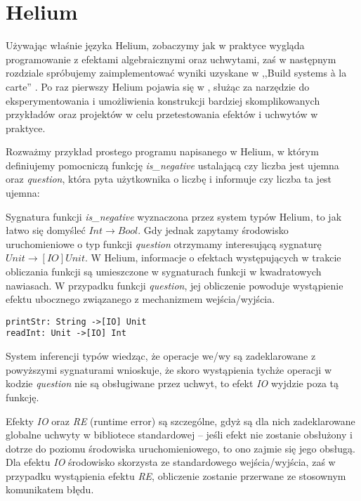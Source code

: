 \section{Helium}

\lstset{language=Haleff, showstringspaces=false}

Używając właśnie języka Helium, zobaczymy jak w praktyce wygląda programowanie z efektami algebraicznymi oraz uchwytami, zaś w następnym rozdziale spróbujemy zaimplementować wyniki uzyskane w ,,Build systems {\`a} la carte'' \cite{mokhov2018build, mokhov2020build}. Po raz pierwszy Helium pojawia się w \cite{biernacki2019abstracting}, służąc za narzędzie do eksperymentowania i umożliwienia konstrukcji bardziej skomplikowanych przykładów oraz projektów w celu przetestowania efektów i uchwytów w praktyce.

Rozważmy przykład prostego programu napisanego w Helium, w którym definiujemy pomocniczą funkcję \textit{is\_negative} ustalającą czy liczba jest ujemna oraz \textit{question}, która pyta użytkownika o liczbę i informuje czy liczba ta jest ujemna:



Sygnatura funkcji \textit{is\_negative} wyznaczona przez system typów Helium, to jak łatwo się domyśleć \(\mathit{Int \rightarrow Bool}\). Gdy jednak zapytamy środowisko uruchomieniowe o typ funkcji \textit{question} otrzymamy interesującą sygnaturę \(\mathit{Unit \rightarrow[IO] Unit}\). W Helium, informacje o efektach występujących w trakcie obliczania funkcji są umieszczone w sygnaturach funkcji w kwadratowych nawiasach. W przypadku funkcji \textit{question}, jej obliczenie powoduje wystąpienie efektu ubocznego związanego z mechanizmem wejścia/wyjścia. 

\begin{lstlisting}
printStr: String ->[IO] Unit
readInt: Unit ->[IO] Int
\end{lstlisting}

System inferencji typów wiedząc, że operacje we/wy są zadeklarowane z powyższymi sygnaturami wnioskuje, że skoro wystąpienia tychże operacji w kodzie \textit{question} nie są obsługiwane przez uchwyt, to efekt \textit{IO} wyjdzie poza tą funkcję.

Efekty \textit{IO} oraz \textit{RE} (runtime error) są szczególne, gdyż są dla nich zadeklarowane globalne uchwyty w bibliotece standardowej -- jeśli efekt nie zostanie obsłużony i dotrze do poziomu środowiska uruchomieniowego, to ono zajmie się jego obsługą. Dla efektu \textit{IO} środowisko skorzysta ze standardowego wejścia/wyjścia, zaś w przypadku wystąpienia efektu \textit{RE}, obliczenie zostanie przerwane ze stosownym komunikatem błędu.

